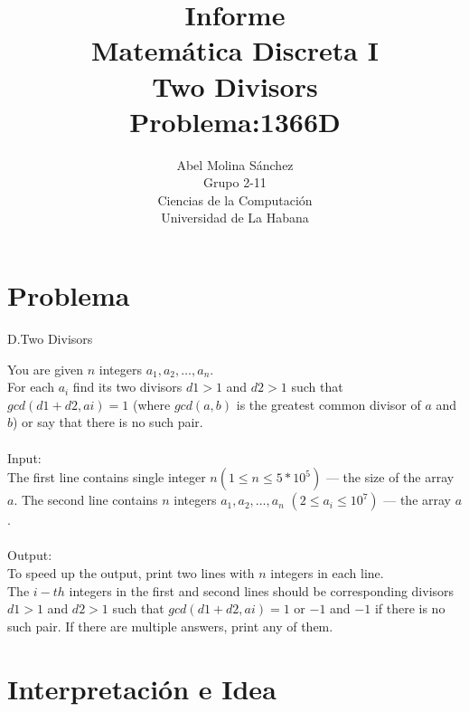 \documentclass[12pt]{article}
\begin{document}
  \title{Informe\\
  Matem\'atica Discreta I\\
     Two Divisors\\
     Problema:1366D}
  \author{Abel Molina S\'anchez\\
  Grupo 2-11\\
  Ciencias de la Computaci\'on\\
  Universidad de La Habana}
    \maketitle  

\newpage

\section{Problema}

\begin{center}

D.Two Divisors

\end{center}

You are given $n$ integers $a_1,a_2,…,a_n$.\\
For each $a_i$ find its two divisors $d1>1$ and $d2>1$ such that $gcd(d1+d2,ai)=1$ (where $gcd(a,b)$ is the greatest common divisor 
of $a$ and $b$) or say that there is no such pair.\\
\\
Input:\\
The first line contains single integer $n(1\leq n\leq 5*10^5)$ — the size of the array $a$.
The second line contains $n$ integers $a_1,a_2,…,a_n$ $(2\leq a_i\leq 10^7)$ — the array $a$.\\
\\
Output:\\
To speed up the output, print two lines with $n$ integers in each line.\\
The $i-th$ integers in the first and second lines should be corresponding divisors $d1>1$ and $d2>1$ such that 
 $gcd(d1+d2,ai)=1$ or $-1$ and $-1$ if there is no such pair. If there are multiple answers, print any of them.\\ 




\section{Interpretación e Idea}
\end{document}
